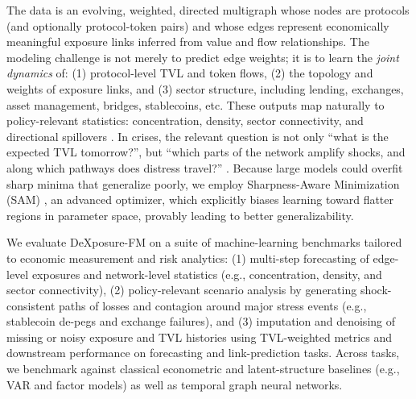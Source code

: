 The data is an evolving, weighted, directed multigraph whose nodes are protocols (and optionally protocol-token pairs) and whose edges represent economically meaningful exposure links inferred from value and flow relationships. The modeling challenge is not merely to predict edge weights; it is to learn the \emph{joint dynamics} of: (1) protocol-level TVL and token flows, (2) the topology and weights of exposure links, and (3) sector structure, including lending, exchanges, asset management, bridges, stablecoins, etc. These outputs map naturally to policy-relevant statistics: concentration, density, sector connectivity, and directional spillovers \citep{DieboldYilmaz2012}. In crises, the relevant question is not only ``what is the expected TVL tomorrow?'', but ``which parts of the network amplify shocks, and along which pathways does distress travel?'' \citep{EisenbergNoe2001,BattistonEtAl2012DebtRank}.
Because large models could overfit sharp minima that generalize poorly, we employ Sharpness-Aware Minimization (SAM) \citep{ForetEtAl2021SAM}, an advanced optimizer, which explicitly biases learning toward flatter regions in parameter space, provably leading to better generalizability.

We evaluate DeXposure-FM on a suite of machine-learning benchmarks tailored to economic measurement and risk analytics: (1) multi-step forecasting of edge-level exposures and network-level statistics (e.g., concentration, density, and sector connectivity), (2) policy-relevant scenario analysis by generating shock-consistent paths of losses and contagion around major stress events (e.g., stablecoin de-pegs and exchange failures), and (3) imputation and denoising of missing or noisy exposure and TVL histories using TVL-weighted metrics and downstream performance on forecasting and link-prediction tasks. Across tasks, we benchmark against classical econometric and latent-structure baselines (e.g., VAR and factor models) as well as temporal graph neural networks. %

